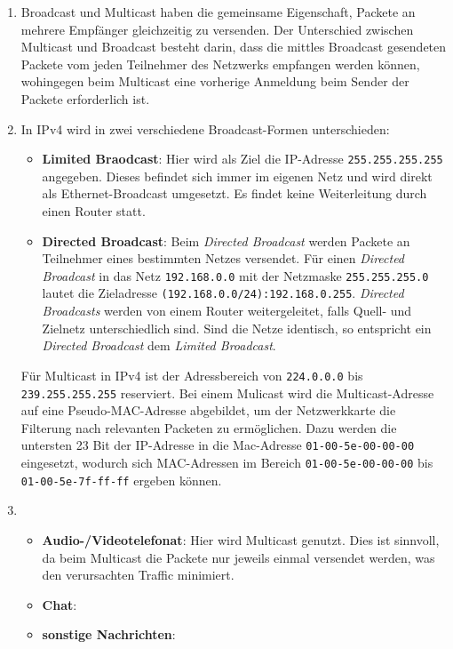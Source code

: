 \documentclass[german,12pt,a4paper]{article}
\begin{document}
\begin{enumerate}

	\item Broadcast und Multicast haben die gemeinsame Eigenschaft, Packete an mehrere Empfänger gleichzeitig zu versenden. 
	Der Unterschied zwischen Multicast und Broadcast besteht darin, dass die mittles Broadcast 
	gesendeten Packete vom jeden Teilnehmer des Netzwerks empfangen werden können, wohingegen beim 
	Multicast eine vorherige Anmeldung beim Sender der Packete erforderlich ist.
	 
	\item In IPv4 wird in zwei verschiedene Broadcast-Formen unterschieden:
		\begin{itemize}
			\item \textbf{Limited Braodcast}: Hier wird als Ziel die IP-Adresse \texttt{255.255.255.255} angegeben. Dieses befindet sich 
			immer im eigenen Netz und wird direkt als Ethernet-Broadcast umgesetzt. Es findet keine Weiterleitung durch einen Router 
			statt.
			\item \textbf{Directed Broadcast}: Beim \textit{Directed Broadcast} werden Packete an Teilnehmer eines bestimmten Netzes versendet.
			Für einen \textit{Directed Broadcast} in das Netz \texttt{192.168.0.0} mit der Netzmaske \texttt{255.255.255.0} lautet die Zieladresse 
			\texttt{(192.168.0.0/24):192.168.0.255}. \textit{Directed Broadcasts} werden von einem Router weitergeleitet, falls Quell- und 
			Zielnetz unterschiedlich sind. Sind die Netze identisch, so entspricht ein \textit{Directed Broadcast} dem \textit{Limited Broadcast}.
		\end{itemize}
		
		
		Für Multicast in IPv4 ist der Adressbereich von \texttt{224.0.0.0} bis \texttt{239.255.255.255} reserviert. Bei einem 
		Mulicast wird die Multicast-Adresse auf eine Pseudo-MAC-Adresse abgebildet, um der Netzwerkkarte die Filterung nach relevanten 
		Packeten zu ermöglichen. Dazu werden die untersten 23 Bit der IP-Adresse in die Mac-Adresse \texttt{01-00-5e-00-00-00} eingesetzt, 
		wodurch sich MAC-Adressen im Bereich \texttt{01-00-5e-00-00-00} bis \texttt{01-00-5e-7f-ff-ff} ergeben können.
		

	\item 
		\begin{itemize}
			\item \textbf{Audio-/Videotelefonat}: Hier wird Multicast genutzt. Dies ist sinnvoll, da beim Multicast die Packete nur jeweils 
			einmal versendet werden, was den verursachten Traffic minimiert.
			\item \textbf{Chat}: 
			\item \textbf{sonstige Nachrichten}:
		\end{itemize}
	
\end{enumerate}
\end{document}
